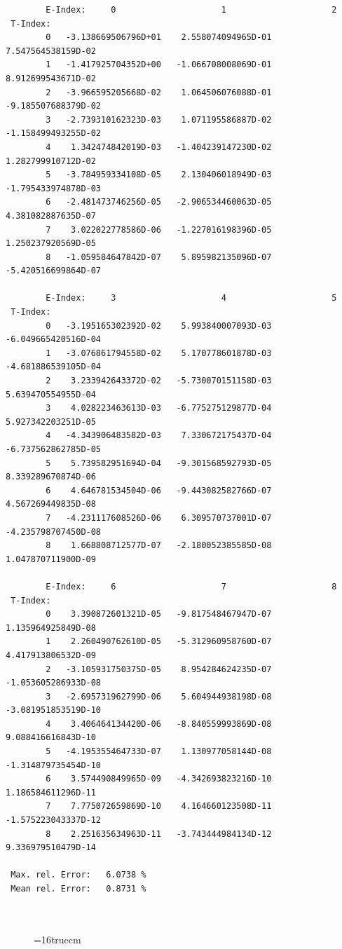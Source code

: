 \documentclass[12pt,dvips]{article}
\begin{document}
\begin{small}\begin{verbatim}
        E-Index:     0                     1                     2
 T-Index:
        0   -3.138669506796D+01    2.558074094965D-01    7.547564538159D-02
        1   -1.417925704352D+00   -1.066708008069D-01    8.912699543671D-02
        2   -3.966595205668D-02    1.064506076088D-01   -9.185507688379D-02
        3   -2.739310162323D-03    1.071195586887D-02   -1.158499493255D-02
        4    1.342474842019D-03   -1.404239147230D-02    1.282799910712D-02
        5   -3.784959334108D-05    2.130406018949D-03   -1.795433974878D-03
        6   -2.481473746256D-05   -2.906534460063D-05    4.381082887635D-07
        7    3.022022778586D-06   -1.227016198396D-05    1.250237920569D-05
        8   -1.059584647842D-07    5.895982135096D-07   -5.420516699864D-07

        E-Index:     3                     4                     5
 T-Index:
        0   -3.195165302392D-02    5.993840007093D-03   -6.049665420516D-04
        1   -3.076861794558D-02    5.170778601878D-03   -4.681886539105D-04
        2    3.233942643372D-02   -5.730070151158D-03    5.639470554955D-04
        3    4.028223463613D-03   -6.775275129877D-04    5.927342203251D-05
        4   -4.343906483582D-03    7.330672175437D-04   -6.737562862785D-05
        5    5.739582951694D-04   -9.301568592793D-05    8.339289670874D-06
        6    4.646781534504D-06   -9.443082582766D-07    4.567269449835D-08
        7   -4.231117608526D-06    6.309570737001D-07   -4.235798707450D-08
        8    1.668808712577D-07   -2.180052385585D-08    1.047870711900D-09

        E-Index:     6                     7                     8
 T-Index:
        0    3.390872601321D-05   -9.817548467947D-07    1.135964925849D-08
        1    2.260490762610D-05   -5.312960958760D-07    4.417913806532D-09
        2   -3.105931750375D-05    8.954284624235D-07   -1.053605286933D-08
        3   -2.695731962799D-06    5.604944938198D-08   -3.081951853519D-10
        4    3.406464134420D-06   -8.840559993869D-08    9.088416616843D-10
        5   -4.195355464733D-07    1.130977058144D-08   -1.314879735454D-10
        6    3.574490849965D-09   -4.342693823216D-10    1.186584611296D-11
        7    7.775072659869D-10    4.164660123508D-11   -1.575223043337D-12
        8    2.251635634963D-11   -3.743444984134D-12    9.336979510479D-14

 Max. rel. Error:   6.0738 %
 Mean rel. Error:   0.8731 %



\end{verbatim}\end{small}
\begin{figure} \label{2.1.8b}
\epsfxsize=16truecm
\end{figure}
\newpage
\end{document}

